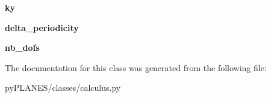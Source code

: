 \begin{DoxyCompactItemize}
{\bfseries ky}
\item 
\mbox{\label{classpy_p_l_a_n_e_s_1_1classes_1_1calculus_1_1_fem_calculus_a72e4423ba0df40c9a93e5d816660e084}} 
{\bfseries delta\+\_\+periodicity}
\item 
\mbox{\label{classpy_p_l_a_n_e_s_1_1classes_1_1calculus_1_1_fem_calculus_a7b84fa22a90d345b021cde23817bfe5f}} 
{\bfseries nb\+\_\+dofs}
\end{DoxyCompactItemize}


The documentation for this class was generated from the following file\+:\begin{DoxyCompactItemize}
\item 
py\+P\+L\+A\+N\+E\+S/classes/calculus.\+py\end{DoxyCompactItemize}
